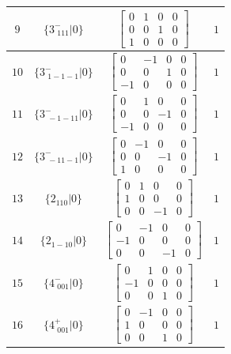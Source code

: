 \documentclass[fleqn,8pt]{jsarticle}
\begin{document}
\begin{longtable}{cccc}
$ 9 $ & $ \{3^{-}_{\,\,111}|0\} $ & $ \begin{bmatrix} 0 & 1 & 0 & 0 \\ 0 & 0 & 1 & 0 \\ 1 & 0 & 0 & 0 \end{bmatrix} $ & $ 1 $ \\ \hline
$ 10 $ & $ \{3^{-}_{\,\,1-1-1}|0\} $ & $ \begin{bmatrix} 0 & -1 & 0 & 0 \\ 0 & 0 & 1 & 0 \\ -1 & 0 & 0 & 0 \end{bmatrix} $ & $ 1 $ \\ \hline
$ 11 $ & $ \{3^{-}_{\,\,-1-11}|0\} $ & $ \begin{bmatrix} 0 & 1 & 0 & 0 \\ 0 & 0 & -1 & 0 \\ -1 & 0 & 0 & 0 \end{bmatrix} $ & $ 1 $ \\ \hline
$ 12 $ & $ \{3^{-}_{\,\,-11-1}|0\} $ & $ \begin{bmatrix} 0 & -1 & 0 & 0 \\ 0 & 0 & -1 & 0 \\ 1 & 0 & 0 & 0 \end{bmatrix} $ & $ 1 $ \\ \hline
$ 13 $ & $ \{2{}_{110}|0\} $ & $ \begin{bmatrix} 0 & 1 & 0 & 0 \\ 1 & 0 & 0 & 0 \\ 0 & 0 & -1 & 0 \end{bmatrix} $ & $ 1 $ \\ \hline
$ 14 $ & $ \{2{}_{1-10}|0\} $ & $ \begin{bmatrix} 0 & -1 & 0 & 0 \\ -1 & 0 & 0 & 0 \\ 0 & 0 & -1 & 0 \end{bmatrix} $ & $ 1 $ \\ \hline
$ 15 $ & $ \{4^{-}_{\,\,001}|0\} $ & $ \begin{bmatrix} 0 & 1 & 0 & 0 \\ -1 & 0 & 0 & 0 \\ 0 & 0 & 1 & 0 \end{bmatrix} $ & $ 1 $ \\ \hline
$ 16 $ & $ \{4^{+}_{\,\,001}|0\} $ & $ \begin{bmatrix} 0 & -1 & 0 & 0 \\ 1 & 0 & 0 & 0 \\ 0 & 0 & 1 & 0 \end{bmatrix} $ & $ 1 $ \\ \hline

\end{longtable}
\end{document}
